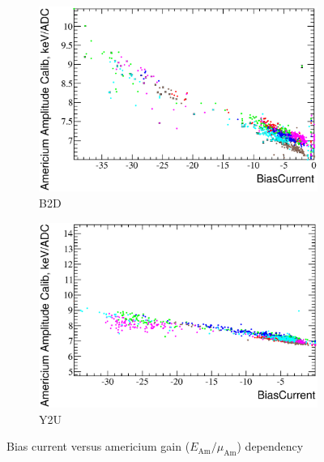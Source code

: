 \documentclass[a4paper,12pt]{article}
\begin{document}
\begin{figure}[p]
\begin{subfigure}[b]{0.5\textwidth}
\includegraphics[width=\textwidth]{gfx/run13_alpha_study/B2D/c_hBiasCurrent_AmAmpCoef.eps}
\caption{B2D}\label{bc_vs_gain-b2d}
\end{subfigure}
\begin{subfigure}[b]{0.5\textwidth}
\includegraphics[width=\textwidth]{gfx/run13_alpha_study/Y2U/c_hBiasCurrent_AmAmpCoef.eps}
\caption{Y2U}\label{bc_vs_gain-y2u}
\end{subfigure}

\caption{Bias current versus americium gain ($E_{\text{Am}} / \mu_{\text{Am}}$) dependency}
\label{fig:bc_vs_gain}
\end{figure}
\end{document}
